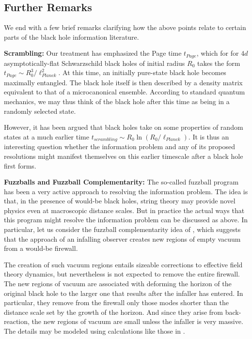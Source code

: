 \documentclass[10pt]{article}
\begin{document}
\subsection{Further Remarks}
\label{remarks}

We end with a few brief remarks clarifying how the above points relate to certain parts of the black hole information literature.

{\bf Scrambling:}  Our treatment has emphasized the Page time $t_{Page}$, which for
for $4d$ asymptotically-flat Schwarzschild black holes of initial radius $R_0$ takes the form $t_{Page} \sim R_0^3/\ell_{Planck}^2$.  At this time, an initially pure-state black hole becomes maximally entangled.  The black hole itself is then described by a density matrix equivalent to that of a microcanonical ensemble. According to standard quantum mechanics, we may thus think of the black hole after this time as being in a randomly selected state.

However, it has been argued \cite{Hayden:2007cs,Sekino:2008he} that black holes take on some properties of random states at a much earlier time $t_{scrambling} \sim R_0 \ln \left(R_0/\ell_{Planck}\right)$.  It is thus an interesting question \cite{Almheiri:2012rt} whether the information problem and any of its proposed resolutions might manifest themselves on this earlier timescale after a black hole first forms.


{\bf Fuzzballs and Fuzzball Complementarity:}   The so-called fuzzball program \cite{Mathur:2005zp,Bena:2007kg,Balasubramanian:2008da,Skenderis:2008qn,Mathur:2008nj,Chowdhury:2010ct,Bena:2013dka} has been a very active approach to resolving the information problem.  The idea is that, in the presence of would-be black holes, string theory may provide novel physics even at macroscopic distance scales.  But in practice the actual ways that this program might resolve the information problem can be discussed as above.  In particular, let us consider the fuzzball complementarity idea of \cite{Mathur:2012jk,Mathur:2013gua}, which suggests that the approach of an infalling observer creates new regions of empty vacuum from a would-be firewall.

The creation of such vacuum regions entails sizeable corrections to effective field theory dynamics, but nevertheless is not expected to remove the entire firewall.  The new regions of vacuum are associated with deforming the horizon of the original black hole to the larger one that results after the infaller has entered.  In particular, they remove  from the firewall only those modes shorter than the distance scale set by the growth of the horizon. And since they arise from back-reaction, the new regions of vacuum are small unless the infaller is very massive.  The details may be modeled using calculations like those in \cite{Amsel:2007cw}.
\end{document}
